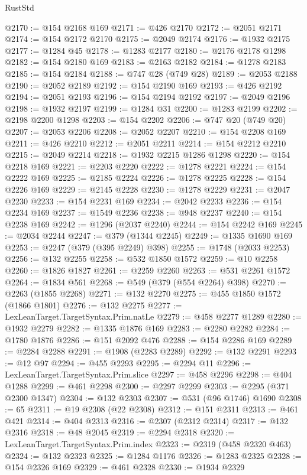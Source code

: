 \begin{lexlean}{RustStd}
\begin{coremodule}
@2170 := @154 @2168 @169
@2171 := @426 @2170
@2172 := @2051 @2171
@2174 := @154 @2172 @2170
@2175 := @2049 @2174
@2176 := @1932 @2175
@2177 := @1284 @45
@2178 := @1283 @2177
@2180 := @2176 @2178 @1298
@2182 := @154 @2180 @169
@2183 := @2163 @2182
@2184 := @1278 @2183
@2185 := @154 @2184
@2188 := @747 @28 (@749 @28)
@2189 := @2053 @2188
@2190 := @2052 @2189
@2192 := @154 @2190 @169
@2193 := @426 @2192
@2194 := @2051 @2193
@2196 := @154 @2194 @2192
@2197 := @2049 @2196
@2198 := @1932 @2197
@2199 := @1284 @31
@2200 := @1283 @2199
@2202 := @2198 @2200 @1298
@2203 := @154 @2202
@2206 := @747 @20 (@749 @20)
@2207 := @2053 @2206
@2208 := @2052 @2207
@2210 := @154 @2208 @169
@2211 := @426 @2210
@2212 := @2051 @2211
@2214 := @154 @2212 @2210
@2215 := @2049 @2214
@2218 := @1932 @2215 @1286 @1298
@2220 := @154 @2218 @169
@2221 := @2203 @2220
@2222 := @1278 @2221
@2224 := @154 @2222 @169
@2225 := @2185 @2224
@2226 := @1278 @2225
@2228 := @154 @2226 @169
@2229 := @2145 @2228
@2230 := @1278 @2229
@2231 := @2047 @2230
@2233 := @154 @2231 @169
@2234 := @2042 @2233
@2236 := @154 @2234 @169
@2237 := @1549 @2236
@2238 := @948 @2237
@2240 := @154 @2238 @169
@2242 := @1296 (@2037 @2240)
@2244 := @154 @2242 @169
@2245 := @2034 @2244
@2247 := @379 (@1344 @2245)
@2249 := @1335 @1690 @169
@2253 := @2247 (@379 (@395 @2249) @398)
@2255 := @1748 (@2033 @2253)
@2256 := @132 @2255
@2258 := @532 @1850 @1572
@2259 := @10 @2258
@2260 := @1826 @1827
@2261 := @2259 @2260
@2263 := @531 @2261 @1572
@2264 := @1834 @561
@2268 := @549 (@379 (@554 @2264) @398)
@2270 := @2263 (@1855 @2268)
@2271 := @132 @2270
@2275 := @455 @1850 @1572 (@1866 @1801)
@2276 := @132 @2275
@2277 := LexLeanTarget.TargetSyntax.Prim.natLe
@2279 := @458 @2277 @1289
@2280 := @1932 @2279
@2282 := @1335 @1876 @169
@2283 := @2280 @2282
@2284 := @1780 @1876
@2286 := @151 @2092 @476
@2288 := @154 @2286 @169
@2289 := @2284 @2288
@2291 := @1908 (@2283 @2289)
@2292 := @132 @2291
@2293 := @12 @97
@2294 := @455 @2293
@2295 := @2294 @11
@2296 := LexLeanTarget.TargetSyntax.Prim.slice
@2297 := @458 @2296
@2298 := @404 @1288
@2299 := @461 @2298
@2300 := @2297 @2299
@2303 := @2295 (@371 @2300 @1347)
@2304 := @132 @2303
@2307 := @531 (@96 @1746) @1690
@2308 := 65
@2311 := @19 @2308 (@22 @2308)
@2312 := @151 @2311
@2313 := @461 @421
@2314 := @404 @2313
@2316 := @2307 (@2312 @2314)
@2317 := @132 @2316
@2318 := @48 @2045
@2319 := @2294 @2318
@2320 := LexLeanTarget.TargetSyntax.Prim.index
@2323 := @2319 (@458 @2320 @463)
@2324 := @132 @2323
@2325 := @1284 @1176
@2326 := @1283 @2325
@2328 := @154 @2326 @169
@2329 := @461 @2328
@2330 := @1934 @2329

\end{coremodule}
\end{lexlean}
